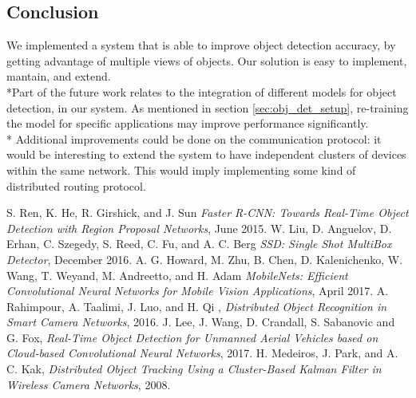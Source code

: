\documentclass[10pt,conference,compsocconf]{IEEEtran}
\begin{document}
\begin{enumerate}
\section{Conclusion}
\label{sec:conclusion}
We implemented a system that is able to improve object detection accuracy, by getting advantage of multiple views of objects. Our solution is easy to implement, mantain, and extend.
\\*Part of the future work relates to the integration of different models for object detection, in our system. As mentioned in section \ref{sec:obj_det_setup}, re-training the model for specific applications may improve performance significantly.\\*
Additional improvements could be done on the communication protocol: it would be interesting to extend the system to have independent clusters of devices within the same network. This would imply implementing some kind of distributed routing protocol.
\begin{thebibliography}{1}
\label{reference0}
S. Ren, K. He, R. Girshick, and J. Sun \emph{Faster R-CNN: Towards Real-Time Object
Detection with Region Proposal Networks}, June 2015.
\vspace*{-0.8\baselineskip}
\label{reference1}
W. Liu, D. Anguelov, D. Erhan, C. Szegedy, S. Reed, C. Fu, and A. C. Berg \emph{SSD: Single Shot MultiBox Detector}, December 2016.
\vspace*{-0.8\baselineskip}
\label{reference2}
A. G. Howard, M. Zhu, B. Chen, D. Kalenichenko, W. Wang, T. Weyand, M. Andreetto, and H. Adam \emph{MobileNets: Efficient Convolutional Neural Networks for Mobile Vision Applications}, April 2017.
\vspace*{-0.8\baselineskip}
\label{reference3}
A. Rahimpour, A. Taalimi, J. Luo, and H. Qi , \emph{Distributed Object Recognition in Smart Camera Networks}, 2016.
\vspace*{-0.8\baselineskip}
\label{reference6}
J. Lee, J. Wang, D. Crandall, S. Sabanovic and G. Fox, \emph{Real-Time Object Detection for Unmanned Aerial Vehicles based on Cloud-based Convolutional Neural Networks}, 2017.
\vspace*{-0.8\baselineskip}
\label{reference4}
H. Medeiros, J. Park, and A. C. Kak, \emph{Distributed Object Tracking Using a Cluster-Based Kalman Filter in Wireless Camera Networks}, 2008.

\end{thebibliography}
\end{enumerate}
\end{document}

